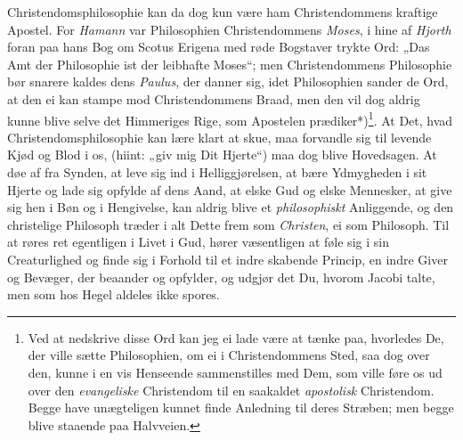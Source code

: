 \documentclass[12pt,a4paper]{book}
\newcommand{\apage}[1]{\marginnote{\footnotesize\textit{[#1]}}}
\begin{document}
Christendomsphilosophie kan da dog kun være ham Christendommens kraftige
Apostel. For \emph{Hamann} var Philosophien Christendommens \emph{Moses}, i hine af \emph{Hjorth}
foran paa hans Bog om Scotus Erigena med røde Bogstaver trykte Ord: „Das Amt
der Philosophie ist der leibhafte Moses“; men Christendommens Philosophie bør
snarere kaldes dens \emph{Paulus}, der danner sig, idet Philosophien sander de Ord, at
den ei kan stampe mod Christendommens Braad, men den vil dog aldrig kunne
blive selve det Himmeriges Rige, som Apostelen prædiker*)\footnote{Ved at
nedskrive disse Ord kan jeg ei lade være at tænke paa, hvorledes De, der ville
sætte Philosophien, om ei i Christendommens Sted, saa dog over den, kunne i en
vis Henseende sammenstilles med Dem, som ville føre os ud over den
\emph{evangeliske} Christendom til en saakaldet \emph{apostolisk} Christendom.
Begge have unægteligen kunnet finde Anledning til deres Stræben; men begge
blive staaende paa Halvveien.}. At Det, hvad Christendomsphilosophie kan lære
klart at skue, maa forvandle sig til levende Kjød og Blod i os, (hiint: „giv
mig Dit Hjerte“) maa dog blive Hovedsagen. At døe af fra Synden, at leve sig
ind i Helliggjørelsen, at bære Ydmygheden i sit Hjerte og lade sig opfylde af
dens Aand, at elske Gud og elske Mennesker, at give sig hen i Bøn og i
Hengivelse, kan aldrig blive et \emph{philosophiskt} Anliggende, og den christelige
Philosoph træder i alt Dette frem som \emph{Christen}, ei som Philosoph. Til at \apage{120} røres
ret egentligen i Livet i Gud, hører væsentligen at føle sig i sin
Creaturlighed og finde sig i Forhold til et indre skabende Princip, en indre
Giver og Bevæger, der beaander og opfylder, og udgjør det Du, hvorom Jacobi
talte, men som hos Hegel aldeles ikke spores.
\end{document}
